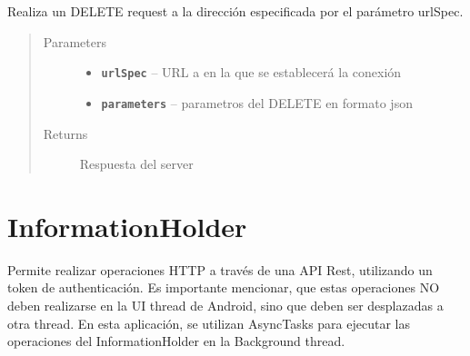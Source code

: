 \documentclass[letterpaper,10pt,english]{sphinxmanual}
\begin{document}
\begin{fulllineitems}
\label{Singletons/ServerHandler:com.fiuba.tallerii.jobify.ServerHandler.DELETE(String, String)}
Realiza un DELETE request a la dirección especificada por el parámetro urlSpec.
\begin{quote}\begin{description}
\item[{Parameters}] \leavevmode\begin{itemize}
\item {} 
\textbf{\texttt{urlSpec}} -- URL a en la que se establecerá la conexión

\item {} 
\textbf{\texttt{parameters}} -- parametros del DELETE en formato json

\end{itemize}

\item[{Returns}] \leavevmode
Respuesta del server

\end{description}\end{quote}

\end{fulllineitems}



\section{InformationHolder}
\label{Singletons/InformationHolder::doc}\label{Singletons/InformationHolder:informationholder}

\begin{fulllineitems}
\label{Singletons/InformationHolder:com.fiuba.tallerii.jobify.InformationHolder}
Permite realizar operaciones HTTP a través de una API Rest, utilizando un token de authenticación.
Es importante mencionar, que estas operaciones NO deben realizarse en la UI thread de Android, sino que deben ser desplazadas a otra thread. En esta aplicación, se utilizan AsyncTasks para ejecutar las operaciones del InformationHolder en la Background thread.

\end{fulllineitems}
\end{document}
